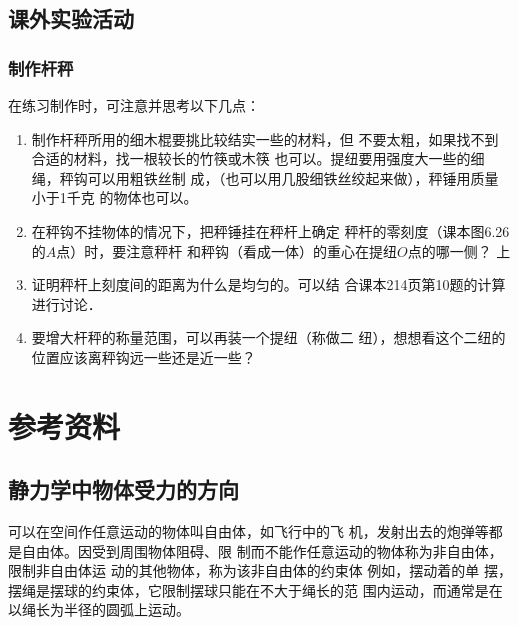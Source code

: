 \subsection{课外实验活动}
\subsubsection{制作杆秤}
在练习制作时，可注意并思考以下几点：
\begin{enumerate}
\item 制作杆秤所用的细木棍要挑比较结实一些的材料，但
不要太粗，如果找不到合适的材料，找一根较长的竹筷或木筷
也可以。提纽要用强度大一些的细绳，秤钩可以用粗铁丝制
成，（也可以用几股细铁丝绞起来做），秤锤用质量小于1千克
的物体也可以。
\item 在秤钩不挂物体的情况下，把秤锤挂在秤杆上确定
秤杆的零刻度（课本图6.26的$A$点）时，要注意秤杆
和秤钩（看成一体）的重心在提纽$O$点的哪一侧？
上
\item 证明秤杆上刻度间的距离为什么是均匀的。可以结
合课本214页第10题的计算进行讨论．
\item 要增大杆秤的称量范围，可以再装一个提纽（称做二
纽），想想看这个二纽的位置应该离秤钩远一些还是近一些？
\end{enumerate}









































\section{参考资料}
\subsection{静力学中物体受力的方向}
可以在空间作任意运动的物体叫自由体，如飞行中的飞
机，发射出去的炮弹等都是自由体。因受到周围物体阻碍、限
制而不能作任意运动的物体称为非自由体，限制非自由体运
动的其他物体，称为该非自由体的约束体 例如，摆动着的单
摆，摆绳是摆球的约束体，它限制摆球只能在不大于绳长的范
围内运动，而通常是在以绳长为半径的圆弧上运动。

